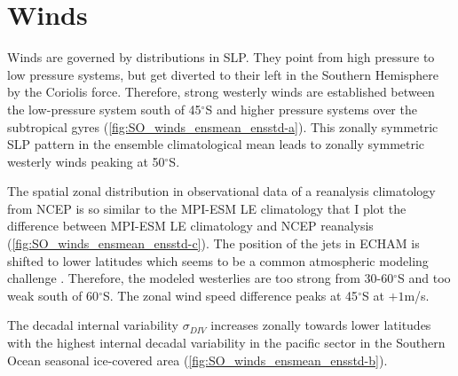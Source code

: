 \section{Winds}
\label{sec:winds_model_eval}
Winds are governed by distributions in \ac{SLP}. They point from high pressure to low pressure systems, but get diverted to their left in the Southern Hemisphere by the Coriolis force. Therefore, strong westerly winds are established between the low-pressure system south of 45$^\circ$S and higher pressure systems over the subtropical gyres (\autoref{fig:SO_winds_ensmean_ensstd-a}). This zonally symmetric \acs{SLP} pattern in the ensemble climatological mean leads to zonally symmetric westerly winds peaking at 50$^\circ$S.\newline

The spatial zonal distribution in observational data of a reanalysis climatology from \acf{NCEP} is so similar to the \acs{MPI-ESM LE} climatology that I plot the difference between \acs{MPI-ESM LE} climatology and \acs{NCEP} reanalysis \citep{Kalnay1996} (\autoref{fig:SO_winds_ensmean_ensstd-c}). The position of the jets in \acs{ECHAM} is shifted to lower latitudes \citep{Stevens2013} which seems to be a common atmospheric modeling challenge \citep{Kidston2010}. Therefore, the modeled westerlies are too strong from 30-60$^\circ$S and too weak south of 60$^\circ$S. The zonal wind speed difference peaks at 45$^\circ$S at $+1$m/s.

The decadal internal variability $\sigma_{DIV}$ increases zonally towards lower latitudes with the highest internal decadal variability in the pacific sector in the Southern Ocean seasonal ice-covered area (\autoref{fig:SO_winds_ensmean_ensstd-b}).\newline

